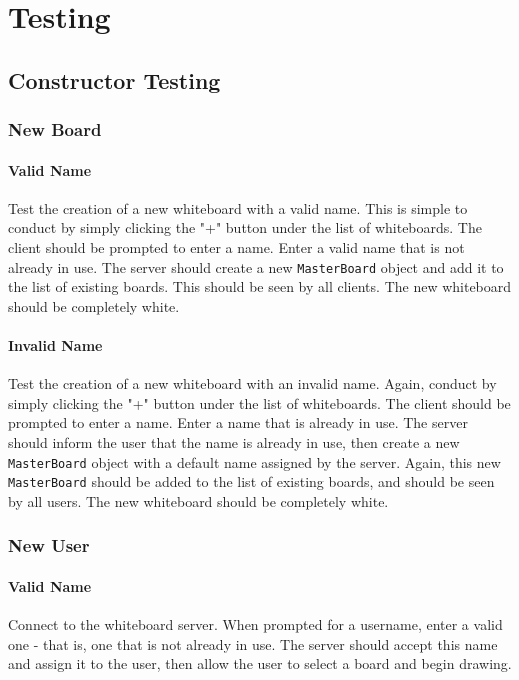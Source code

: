 \section{Testing}

\subsection{Constructor Testing}

\subsubsection{New Board} 

\paragraph{Valid Name}
Test the creation of a new whiteboard with a valid name. This is simple to conduct by simply clicking the "+" button under the list of whiteboards. The client should be prompted to enter a name. Enter a valid name that is not already in use. The server should create a new \texttt{MasterBoard} object and add it to the list of existing boards.  This should be seen by all clients. The new whiteboard should be completely white.

\paragraph{Invalid Name}
Test the creation of a new whiteboard with an invalid name. Again, conduct by simply clicking the "+" button under the list of whiteboards. The client should be prompted to enter a name. Enter a name that is already in use. The server should inform the user that the name is already in use, then create a new \texttt{MasterBoard} object with a default name assigned by the server. Again, this new \texttt{MasterBoard} should be added to the list of existing boards, and should be seen by all users. The new whiteboard should be completely white.

\subsubsection{New User}

\paragraph{Valid Name}
Connect to the whiteboard server.  When prompted for a username, enter a valid one - that is, one that is not already in use.  The server should accept this name and assign it to the user, then allow the user to select a board and begin drawing.

